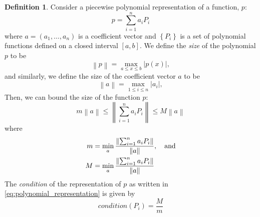 \documentclass[12pt]{article}
\theoremstyle{definition}
\newtheorem{definition}{Definition}[section]
\begin{document}
\begin{definition}\label{definition:basis_condition}
Consider a piecewise polynomial representation of a function, $p$:
\begin{equation} \label{eq:polynomial_representation}
p = \sum_{i=1}^n a_i P_i
\end{equation}
\noindent
where $a = \left(a_1,\dots,a_n\right)$ is a coefficient vector and $\left\{ P_i\right\}$ is a set of polynomial functions defined on a closed interval $\left[a,b\right]$. We define the \emph{size} of the polynomial $p$ to be
\[
\left \lVert p \right \rVert = \max_{a\le x\le b} \left \lvert p\left(x\right) \right \rvert,
\]
\noindent
and similarly, we define the size of the coefficient vector $a$ to be
\[
\left \lVert a \right \rVert = \max_{1\le i \le n} \left \lvert a_i \right \rvert,
\]
Then, we can bound the size of the function $p$:
\begin{equation} \label{eq:polynomial_expansion_size_bounds}
m\left \lVert a \right \rVert \le \left \lVert \sum_{i=1}^n a_i P_i \right \rVert \le  M \left \lVert a \right \rVert
\end{equation}
\noindent
where 
\begin{align*}
m &= \min_a \frac{\left \lVert \sum_{i=1}^n a_i P_i \right \rVert}{\left \lVert a \right \rVert},\quad \textup{and}\\
M &= \min_a \frac{\left \lVert \sum_{i=1}^n a_i P_i \right \rVert}{\left \lVert a \right \rVert}
\end{align*}
The \emph{condition} of the representation of $p$ as written in \ref{eq:polynomial_representation} is given by 
\[
\textit{condition}\left( P_i \right) = \frac{M}{m}
\]
\end{definition}
\end{document}
